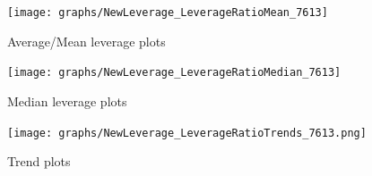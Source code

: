 \documentclass[12pt, a4paper]{article} %
\begin{document}

\iffalse

\begin{figure}[hbtp]
\centering
\caption{Average/Mean leverage plots}
\texttt{[image: graphs/NewLeverage\_LeverageRatioMean\_7613]}
\end{figure}


\begin{figure}[hbtp]
\centering
\caption{Median leverage plots}
\texttt{[image: graphs/NewLeverage\_LeverageRatioMedian\_7613]}
\end{figure}



\begin{figure}[hbtp]
\centering
\caption{Trend plots}
\texttt{[image: graphs/NewLeverage\_LeverageRatioTrends\_7613.png]}
\end{figure}
\end{document}
